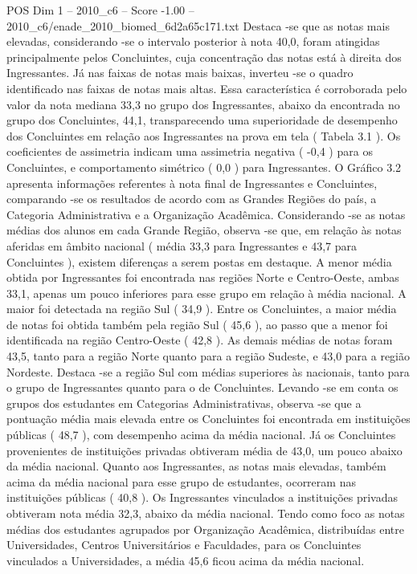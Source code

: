 \begin{textsample}{POS Dim 1 – 2010\_c6 – Score -1.00 – 2010\_c6/enade\_2010\_biomed\_6d2a65c171.txt}
Destaca -se que as notas mais elevadas, considerando -se o intervalo posterior à nota 40,0, foram atingidas principalmente pelos Concluintes, cuja concentração das notas está à direita dos Ingressantes.
Já nas faixas de notas mais baixas, inverteu -se o quadro identificado nas faixas de notas mais altas.
Essa característica é corroborada pelo valor da nota mediana 33,3 no grupo dos Ingressantes, abaixo da encontrada no grupo dos Concluintes, 44,1, transparecendo uma superioridade de desempenho dos Concluintes em relação aos Ingressantes na prova em tela ( Tabela 3.1 ).
Os coeficientes de assimetria indicam uma assimetria negativa ( -0,4 ) para os Concluintes, e comportamento simétrico ( 0,0 ) para Ingressantes.
O Gráfico 3.2 apresenta informações referentes à nota final de Ingressantes e Concluintes, comparando -se os resultados de acordo com as Grandes Regiões do país, a Categoria Administrativa e a Organização Acadêmica.
Considerando -se as notas médias dos alunos em cada Grande Região, observa -se que, em relação às notas aferidas em âmbito nacional ( média 33,3 para Ingressantes e 43,7 para Concluintes ), existem diferenças a serem postas em destaque.
A menor média obtida por Ingressantes foi encontrada nas regiões Norte e Centro-Oeste, ambas 33,1, apenas um pouco inferiores para esse grupo em relação à média nacional.
A maior foi detectada na região Sul ( 34,9 ).
Entre os Concluintes, a maior média de notas foi obtida também pela região Sul ( 45,6 ), ao passo que a menor foi identificada na região Centro-Oeste ( 42,8 ).
As demais médias de notas foram 43,5, tanto para a região Norte quanto para a região Sudeste, e 43,0 para a região Nordeste.
Destaca -se a região Sul com médias superiores às nacionais, tanto para o grupo de Ingressantes quanto para o de Concluintes.
Levando -se em conta os grupos dos estudantes em Categorias Administrativas, observa -se que a pontuação média mais elevada entre os Concluintes foi encontrada em instituições públicas ( 48,7 ), com desempenho acima da média nacional.
Já os Concluintes provenientes de instituições privadas obtiveram média de 43,0, um pouco abaixo da média nacional.
Quanto aos Ingressantes, as notas mais elevadas, também acima da média nacional para esse grupo de estudantes, ocorreram nas instituições públicas ( 40,8 ).
Os Ingressantes vinculados a instituições privadas obtiveram nota média 32,3, abaixo da média nacional.
Tendo como foco as notas médias dos estudantes agrupados por Organização Acadêmica, distribuídas entre Universidades, Centros Universitários e Faculdades, para os Concluintes vinculados a Universidades, a média 45,6 ficou acima da média nacional.

\end{textsample}
